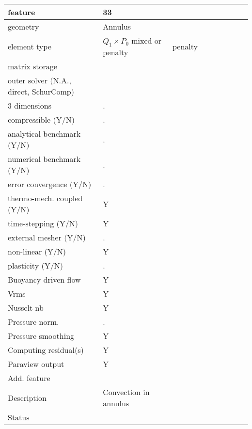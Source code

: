 \begin{landscape}
\vspace{.5cm}

\noindent
{\tiny
\begin{tabular}{|l|p{2cm}|p{2cm}|p{2cm}|p{2cm}|p{2cm}|p{2cm}|p{2cm}|p{2cm}|} 
\hline
feature & 33 & \\ 
\hline
geometry & Annulus & & \\ 
element type & $Q_1\times P_0$ 
mixed or penalty  & penalty &  \\ 
matrix storage &  &  \\ 
outer solver (N.A., direct, SchurComp) &  & \\ 
\hline
3 dimensions 			& . &  \\ 
compressible (Y/N)  		& . &  \\ 
analytical benchmark (Y/N) 	& . &  \\ 
numerical benchmark (Y/N) 	& . &  \\ 
error convergence (Y/N) 	& . &  \\ 
thermo-mech. coupled (Y/N) 	& Y &  \\ 
time-stepping (Y/N) 		& Y &  \\ 
external mesher (Y/N) 		& . &  \\ 
non-linear (Y/N) 		& Y &  \\ 
plasticity (Y/N) 		& . &  \\ 
Buoyancy driven flow 		& Y &  \\ 
Vrms  				& Y &  \\ 
Nusselt nb  			& Y &  \\ 
Pressure norm. 			& . &  \\ 
Pressure smoothing 		& Y &  \\ 
Computing residual(s) 		& Y &  \\ 
Paraview output 		& Y &  \\ 
\hline
Add. feature & & & & &\\
\hline
Description & Convection  in annulus & \\ 
\hline
Status &  &   \\
\hline
\end{tabular}
}






























\end{landscape}
